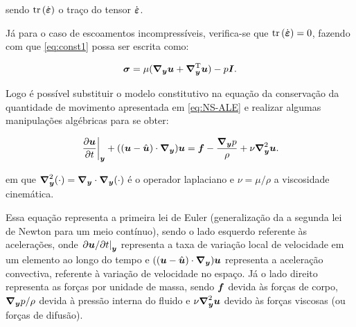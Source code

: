 \noindent sendo $\mathop{\mathrm{tr}}\nolimits{(\dot{\boldsymbol{\varepsilon}})}$ o traço do tensor $\dot{\boldsymbol{\varepsilon}}$.

Já para o caso de escoamentos incompressíveis, verifica-se que $\mathop{\mathrm{tr}}\nolimits{(\dot{\boldsymbol{\varepsilon}})}=0$, fazendo com que \eqref{eq:const1} possa ser escrita como:

\begin{equation}
    \boldsymbol{\sigma}=\mu(\boldsymbol{\nabla_y}\boldsymbol{u}+\boldsymbol{\nabla}^{\mathrm{T}}_{\boldsymbol{y}}\boldsymbol{u})-p\boldsymbol{I}\text{.}\label{eq:ModConst}
\end{equation}

Logo é possível substituir o modelo constitutivo na equação da conservação da quantidade de movimento apresentada em \eqref{eq:NS-ALE} e realizar algumas manipulações algébricas para se obter:

\begin{equation}
    \left.\frac{\partial \boldsymbol{u}}{\partial t}\right|_{\boldsymbol{y}}+((\boldsymbol{u}-\hat{\boldsymbol{u}})\cdot\boldsymbol{\nabla_y})\boldsymbol{u}=\boldsymbol{f}-\frac{\boldsymbol{\nabla_y} p}{\rho}+\nu\boldsymbol{\nabla}^2_{\boldsymbol{y}}\boldsymbol{u}\text{.}
    \label{eq:NS-ALE-2}
\end{equation}

\noindent em que $\boldsymbol{\nabla}^2_{\boldsymbol{y}}(\cdot)=\boldsymbol{\nabla_y}\cdot\boldsymbol{\nabla_y}(\cdot)$ é o operador laplaciano e $\nu=\mu/\rho$ a viscosidade cinemática.

Essa equação representa a primeira lei de Euler (generalização da a segunda lei de Newton para um meio contínuo), sendo o lado esquerdo referente às acelerações, onde $\left.\partial\boldsymbol{u}/\partial t\right|_{\boldsymbol{y}}$ representa a taxa de variação local de velocidade em um elemento ao longo do tempo e $((\boldsymbol{u}-\hat{\boldsymbol{u}})\cdot\boldsymbol{\nabla_y})\boldsymbol{u}$ representa a aceleração convectiva, referente à variação de velocidade no espaço. Já o lado direito representa as forças por unidade de massa, sendo $\boldsymbol{f}$ devida às forças de corpo, $\boldsymbol{\nabla_y} p/\rho$ devida à pressão interna do fluido e $\nu\boldsymbol{\nabla}^2_{\boldsymbol{y}}\boldsymbol{u}$ devido às forças viscosas (ou forças de difusão).

